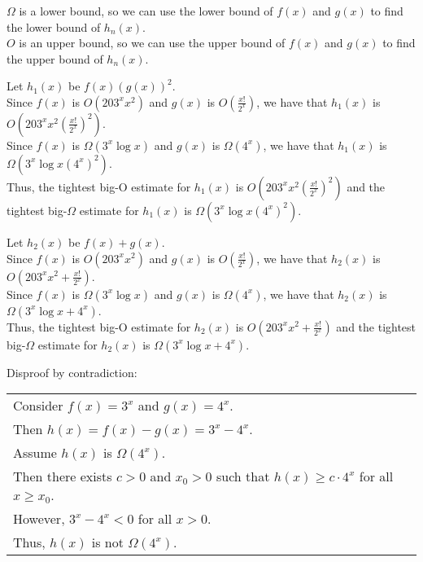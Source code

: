 \documentclass[12pt]{exam}
\begin{document}
\begin{solution}
	$\Omega$ is a lower bound, so we can use the lower bound of $f(x)$ and $g(x)$ to find the lower bound of $h_n(x)$.\\
	$O$ is an upper bound, so we can use the upper bound of $f(x)$ and $g(x)$ to find the upper bound of $h_n(x)$.
	\begin{qparts}
		\item Let $h_1(x)$ be $f(x)(g(x))^2$.\\
		Since $f(x)$ is $O(203^xx^2)$ and $g(x)$ is $O(\frac{x!}{2^x})$, we have that $h_1(x)$ is $O(203^xx^2\left(\frac{x!}{2^x}\right)^2)$.\\
		Since $f(x)$ is $\Omega(3^x\log x)$ and $g(x)$ is $\Omega(4^x)$, we have that $h_1(x)$ is $\Omega(3^x\log x\left(4^x\right)^2)$.\\
		Thus, the tightest big-O estimate for $h_1(x)$ is $O(203^xx^2\left(\frac{x!}{2^x}\right)^2)$ and the tightest big-$\Omega$ estimate for $h_1(x)$ is $\Omega(3^x\log x\left(4^x\right)^2)$.
		\item Let $h_2(x)$ be $f(x)+g(x)$.\\
		Since $f(x)$ is $O(203^xx^2)$ and $g(x)$ is $O(\frac{x!}{2^x})$, we have that $h_2(x)$ is $O(203^xx^2+\frac{x!}{2^x})$.\\
		Since $f(x)$ is $\Omega(3^x\log x)$ and $g(x)$ is $\Omega(4^x)$, we have that $h_2(x)$ is $\Omega(3^x\log x+4^x)$.\\
		Thus, the tightest big-O estimate for $h_2(x)$ is $O(203^xx^2+\frac{x!}{2^x})$ and the tightest big-$\Omega$ estimate for $h_2(x)$ is $\Omega(3^x\log x+4^x)$.

		\item		Disproof by contradiction:\\
		\begin{tabular}{ll}
			Consider $f(x) = 3^x$ and $g(x) = 4^x$.                                                         \\
			Then $h(x) = f(x) - g(x) = 3^x - 4^x$.                                                          \\
			Assume $h(x)$ is $\Omega(4^x)$.                                                                 \\
			Then there exists $c > 0$ and $x_0 > 0$ such that $h(x) \geq c \cdot 4^x$ for all $x \geq x_0$. \\
			However, $3^x - 4^x < 0$ for all $x > 0$.                                                       \\
			Thus, $h(x)$ is not $\Omega(4^x)$.
		\end{tabular}
	\end{qparts}
\end{solution}
\end{document}
